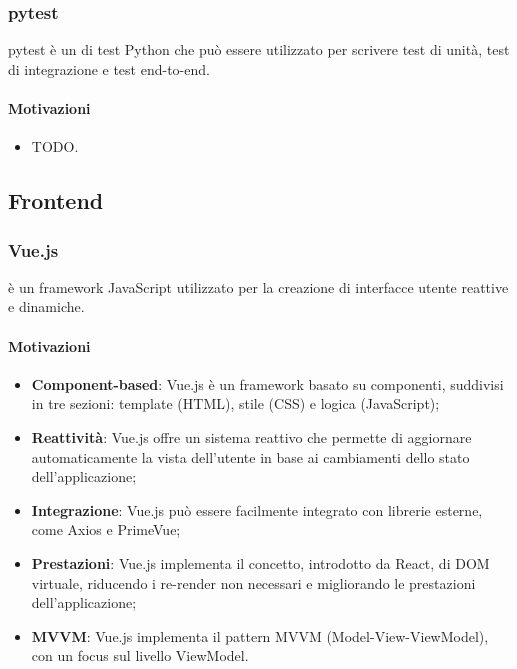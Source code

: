 \subsubsection{pytest}\label{sec:pytest}
\par pytest è un  di test Python che può essere utilizzato per scrivere test di unità, test di integrazione e test end-to-end.
\paragraph*{Motivazioni}
\begin{itemize}
  \item TODO.
\end{itemize}

\subsection{Frontend}\label{sec:tecnologie-frontend}

\subsubsection{Vue.js}\label{sec:vuejs}
\par {} è un framework JavaScript utilizzato per la creazione di interfacce utente reattive e dinamiche.
\paragraph*{Motivazioni}
\begin{itemize}
  \item \textbf{Component-based}: Vue.js è un framework basato su componenti, suddivisi in tre sezioni: template (HTML), stile (CSS) e logica (JavaScript);
  \item \textbf{Reattività}: Vue.js offre un sistema reattivo che permette di aggiornare automaticamente la vista dell'utente in base ai cambiamenti dello stato dell'applicazione;
  \item \textbf{Integrazione}: Vue.js può essere facilmente integrato con librerie esterne, come Axios e PrimeVue;
  \item \textbf{Prestazioni}: Vue.js implementa il concetto, introdotto da React, di DOM virtuale, riducendo i re-render non necessari e migliorando le prestazioni dell'applicazione;
  \item \textbf{MVVM}: Vue.js implementa il pattern MVVM (Model-View-ViewModel), con un focus sul livello ViewModel.
\end{itemize}

